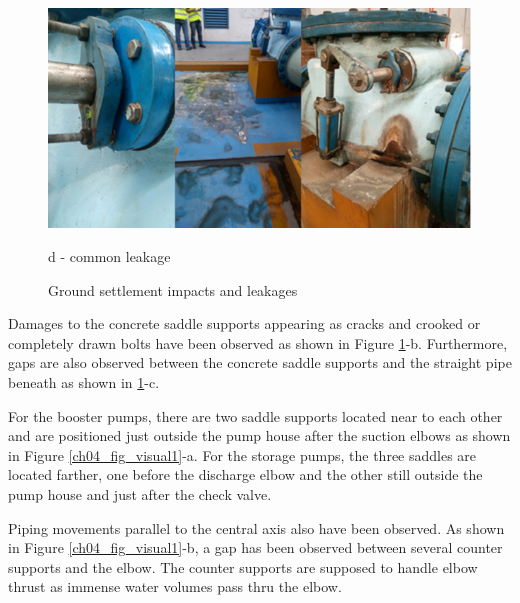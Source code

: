 \begin{figure}[!htb]
	\hspace{0.05cm}
\begin{minipage}[b]{0.5\linewidth}
	\centering
	\includegraphics[width=\textwidth]{figures/ch04_fig_visual03}
	\caption*{d - common leakage}
\end{minipage}
\caption{Ground settlement impacts and leakages}
\label{ch04_settlement}
\end{figure}

Damages to the concrete saddle supports appearing as cracks and crooked or completely drawn bolts have been observed as shown in Figure \ref{ch04_settlement}-b. Furthermore, gaps are also observed between the concrete saddle supports and the straight pipe beneath as shown in \ref{ch04_settlement}-c.  

For the booster pumps, there are two saddle supports located near to each other and are positioned just outside the pump house after the suction elbows as shown in Figure \ref{ch04_fig_visual1}-a. For the storage pumps, the three saddles are located farther, one before the discharge elbow and  the other still outside the pump house and just after the check valve.

Piping movements parallel to the central axis also have been observed. As shown in Figure \ref{ch04_fig_visual1}-b, a gap has been observed between several counter supports and the elbow.  The counter supports are supposed to handle elbow thrust as immense water volumes pass thru the elbow. 

